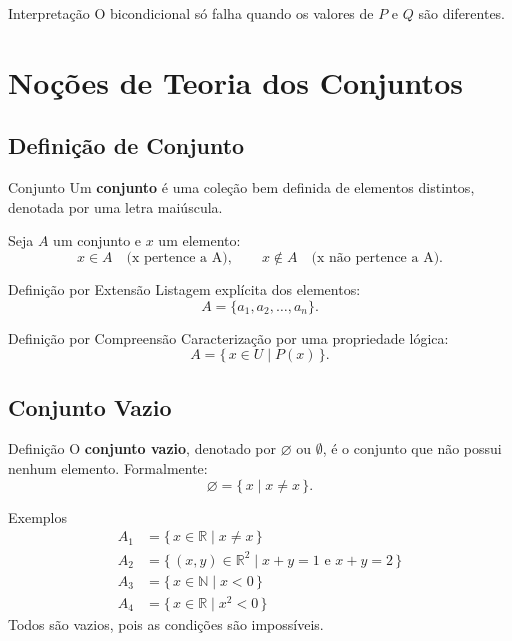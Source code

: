 \documentclass[12pt,a4paper,openright]{book}
\begin{document}
\begin{block}{Interpretação}
O bicondicional só falha quando os valores de \(P\) e \(Q\) são diferentes.
\end{block}

\chapter{Noções de Teoria dos Conjuntos}

\section{Definição de Conjunto}

\begin{block}{Conjunto}
Um \textbf{conjunto} é uma coleção bem definida de elementos distintos, denotada por uma letra maiúscula.
\end{block}

Seja \(A\) um conjunto e \(x\) um elemento:
\[
x \in A \quad \text{(x pertence a A)}, \qquad
x \notin A \quad \text{(x não pertence a A)}.
\]

\begin{block}{Definição por Extensão}
Listagem explícita dos elementos:
\[
A = \{a_1, a_2, \dots, a_n\}.
\]
\end{block}

\begin{block}{Definição por Compreensão}
Caracterização por uma propriedade lógica:
\[
A = \{\, x \in U \mid P(x) \,\}.
\]
\end{block}

\section{Conjunto Vazio}

\begin{block}{Definição}
O \textbf{conjunto vazio}, denotado por \(\varnothing\) ou \(\emptyset\), é o conjunto que não possui nenhum elemento.
Formalmente:
\[
\varnothing = \{\, x \mid x \neq x \,\}.
\]
\end{block}

\begin{block}{Exemplos}
\[
\begin{aligned}
A_1 &= \{\, x \in \mathbb{R} \mid x \neq x \,\} \\
A_2 &= \{\, (x,y) \in \mathbb{R}^2 \mid x+y=1 \text{ e } x+y=2 \,\} \\
A_3 &= \{\, x \in \mathbb{N} \mid x < 0 \,\} \\
A_4 &= \{\, x \in \mathbb{R} \mid x^2 < 0 \,\}
\end{aligned}
\]
Todos são vazios, pois as condições são impossíveis.
\end{block}
\end{document}
